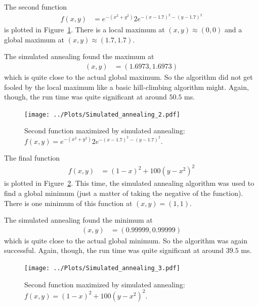 \documentclass[twocolumn]{myarticle}
\begin{document}
The second function
\begin{align}
    f(x,y) &= e^{-\left(x^2 + y^2\right)} 2 e^{-\left( x-1.7 \right)^2 - \left( y - 1.7 \right)^2}
\end{align}
is plotted in Figure~\ref{fig:simulated_annealing_2}.
There is a local maximum at $ (x,y) \approx (0,0) $ and a global maximum at $ (x,y) \approx (1.7, 1.7) $.

The simulated annealing found the maximum at
\begin{align}
    (x,y) &= \left( 1.6973, 1.6973 \right)
\end{align}
which is quite close to the actual global maximum.
So the algorithm did not get fooled by the local maximum like a basic hill-climbing algorithm might.
Again, though, the run time was quite significant at around $ 50.5 $ ms.

\begin{figure}[ht!]
    \begin{center}
    \texttt{[image: ../Plots/Simulated\_annealing\_2.pdf]}
    \caption{%
    Second function maximized by simulated annealing: $ f(x,y) = e^{-\left(x^2 + y^2\right)} 2 e^{-\left( x-1.7 \right)^2 - \left( y - 1.7 \right)^2} $.
    }
    \label{fig:simulated_annealing_2}
    \end{center}
\end{figure}

The final function
\begin{align}
    f(x,y) &= (1-x)^2 + 100 (y-x^2)^2
\end{align}
is plotted in Figure~\ref{fig:simulated_annealing_3}.
This time, the simulated annealing algorithm was used to find a global minimum (just a matter of taking the negative of the function).
There is one minimum of this function at $ (x,y) = (1,1) $.

The simulated annealing found the minimum at
\begin{align}
    (x,y) &= \left( 0.99999, 0.99999 \right)
\end{align}
which is quite close to the actual global minimum.
So the algorithm was again successful.
Again, though, the run time was quite significant at around $ 39.5 $ ms.

\begin{figure}[ht!]
    \begin{center}
    \texttt{[image: ../Plots/Simulated\_annealing\_3.pdf]}
    \caption{%
    Second function maximized by simulated annealing: $ f(x,y) = (1-x)^2 + 100 (y-x^2)^2 $.
    }
    \label{fig:simulated_annealing_3}
    \end{center}
\end{figure}
\end{document}
